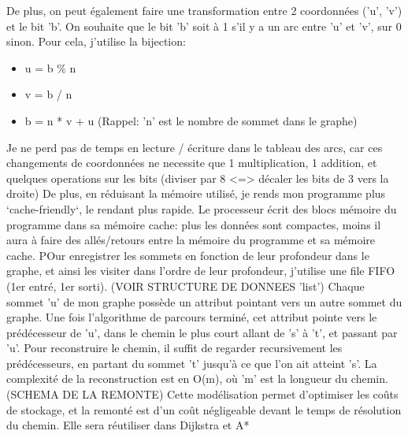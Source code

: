\documentclass[a4paper,10pt]{article}
\begin{document}
    
    De plus, on peut également faire une transformation entre 2 coordonnées ('u', 'v') et le bit 'b'.
    On souhaite que le bit 'b' soit à 1 s'il y a un arc entre 'u' et 'v', sur 0 sinon.
    Pour cela, j'utilise la bijection:
    \begin{itemize}[label=-]
      \item u = b \% n
      \item v = b / n
      \item b = n * v + u (Rappel: 'n' est le nombre de sommet dans le graphe)
    \end{itemize}
    Je ne perd pas de temps en lecture / écriture dans le tableau des arcs, car ces changements
    de coordonnées ne necessite que 1 multiplication, 1 addition, et quelques operations sur les bits (diviser par 8 <=> décaler
    les bits de 3 vers la droite)\newline\newline
    De plus, en réduisant la mémoire utilisé, je rends mon programme plus `cache-friendly`, le rendant plus rapide.
    Le processeur écrit des blocs mémoire du programme dans sa mémoire cache: plus les données sont compactes,
    moins il aura à faire des allés/retours entre la mémoire du programme et sa mémoire cache.\newline\newline
    POur enregistrer les sommets en fonction de leur profondeur dans le graphe, et ainsi les visiter dans l'ordre de leur profondeur,
    j'utilise une file FIFO (1er entré, 1er sorti).\newline
    (VOIR STRUCTURE DE DONNEES 'list')\newline\newline
    Chaque sommet 'u' de mon graphe possède un attribut pointant vers un autre sommet du graphe.
    Une fois l'algorithme de parcours terminé, cet attribut pointe vers le prédécesseur de 'u',
    dans le chemin le plus court allant de 's' à 't', et passant par 'u'.
    Pour reconstruire le chemin, il suffit de regarder recursivement les prédécesseurs, en partant du sommet 't' jusqu'à ce que l'on ait atteint 's'.
    La complexité de la reconstruction est en O(m), où 'm' est la longueur du chemin.\newline\newline
    (SCHEMA DE LA REMONTE)\newline\newline
    Cette modélisation permet d'optimiser les coûts de stockage, et la remonté est d'un coût négligeable devant le temps
    de résolution du chemin. Elle sera réutiliser dans Dijkstra et A*
    
\end{document}
